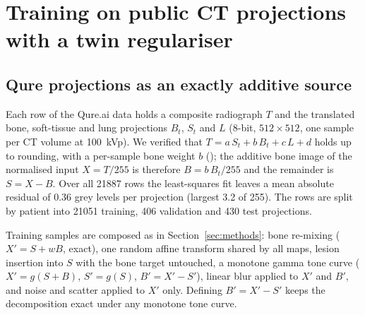 \section{Training on public CT projections with a twin regulariser}
\label{sec:method_v2}
\subsection{Qure projections as an exactly additive source}
Each row of the Qure.ai data holds a composite radiograph $T$ and the translated bone, soft-tissue and lung projections $B_t$, $S_t$ and $L$
(8-bit, $512\times512$, one sample per CT volume at 100~kVp). We verified that $T=a\,S_t+b\,B_t+c\,L+d$ holds up to rounding, with a per-sample bone
weight $b$ (); the additive bone image of the normalised input $X=T/255$ is therefore $B=b\,B_t/255$ and the remainder is
$S=X-B$. Over all \num{21887} rows the least-squares fit leaves a mean absolute residual of 0.36 grey levels per projection (largest 3.2 of 255).
The rows are split by patient into \num{21051} training, 406 validation and 430 test projections.

Training samples are composed as in Section~\ref{sec:methods}: bone re-mixing ($X'=S+wB$, exact), one random affine transform shared by all maps,
lesion insertion into $S$ with the bone target untouched, a monotone gamma tone curve ($X'=g(S+B)$, $S'=g(S)$, $B'=X'-S'$), linear blur applied to
$X'$ and $B'$, and noise and scatter applied to $X'$ only. Defining $B'=X'-S'$ keeps the decomposition exact under any monotone tone curve.

